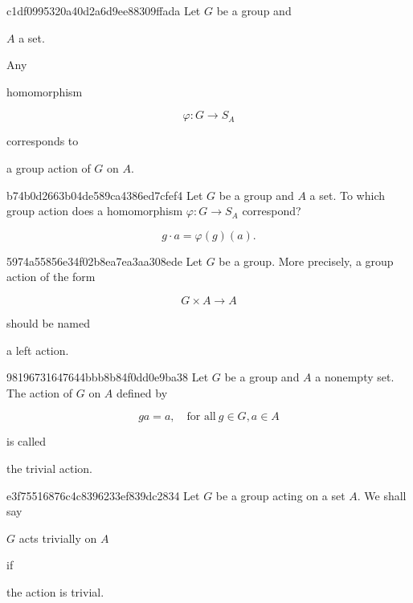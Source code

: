 \begin{note}{c1df0995320a40d2a6d9ee88309ffada}
    Let \({ G }\) be a group and \begin{icloze}{5}\({ A }\) a set.\end{icloze}
    Any \begin{icloze}{3}homomorphism\end{icloze}
    \begin{icloze}{1}
        \[
            \varphi : G \to S_{A}
        \]
    \end{icloze}
    corresponds to \begin{icloze}{2}a group action of \({ G }\) on \({ A }\).\end{icloze}
\end{note}

\begin{note}{b74b0d2663b04de589ca4386ed7cfef4}
    Let \({ G }\) be a group and \({ A }\) a set.
    To which group action does a homomorphism \({ \varphi : G \to S_{A}  }\) correspond?

    \begin{cloze}{1}
        \[
            g \cdot a = \varphi(g)(a).
        \]
    \end{cloze}
\end{note}

\begin{note}{5974a55856e34f02b8ea7ea3aa308ede}
    Let \({ G }\) be a group.
    More precisely, a group action of the form
    \begin{icloze}{2}
        \[
            G \times A \to A
        \]
    \end{icloze}
    should be named \begin{icloze}{1}a left action.\end{icloze}
\end{note}

\begin{note}{98196731647644bbb8b84f0dd0e9ba38}
    Let \({ G }\) be a group and \({ A }\) a nonempty set.
    The action of \({ G }\) on \({ A }\) defined by
    \begin{icloze}{1}
        \[
            ga = a, \quad \text{for all}\ g \in G, a \in A
        \]
    \end{icloze}
    is called \begin{icloze}{1}the trivial action.\end{icloze}
\end{note}

\begin{note}{e3f75516876c4c8396233ef839dc2834}
    Let \({ G }\) be a group acting on a set \({ A }\).
    We shall say \begin{icloze}{2}\({ G }\) acts trivially on \({ A }\)\end{icloze} if \begin{icloze}{1}the action is trivial.\end{icloze}
\end{note}

